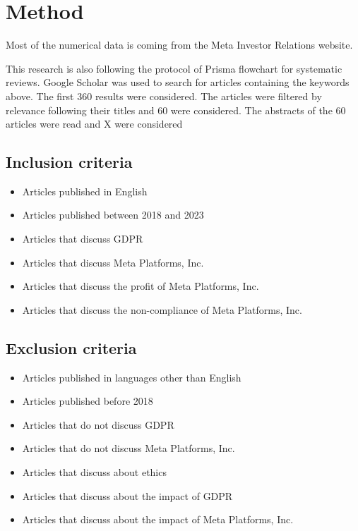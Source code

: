 \documentclass[12pt, a4paper]{article}
\begin{document}
\section*{Method}

Most of the numerical data is coming from the Meta Investor Relations
website\cite{}. 

This research is also following the protocol of Prisma flowchart for systematic
reviews\cite{}. Google Scholar was used to search for articles containing the
keywords above. The first 360 results were considered. The articles were
filtered by relevance following their titles and 60 were considered. The
abstracts of the 60 articles were read and X were considered

\subsection*{Inclusion criteria}

\begin{itemize}
    \item Articles published in English
    \item Articles published between 2018 and 2023
    \item Articles that discuss GDPR
    \item Articles that discuss Meta Platforms, Inc.
    \item Articles that discuss the profit of Meta Platforms, Inc.
    \item Articles that discuss the non-compliance of Meta Platforms, Inc.
\end{itemize}

\subsection*{Exclusion criteria}

\begin{itemize}
    \item Articles published in languages other than English
    \item Articles published before 2018
    \item Articles that do not discuss GDPR
    \item Articles that do not discuss Meta Platforms, Inc.
    \item Articles that discuss about ethics
    \item Articles that discuss about the impact of GDPR
    \item Articles that discuss about the impact of Meta Platforms, Inc.
\end{itemize}
\end{document}
